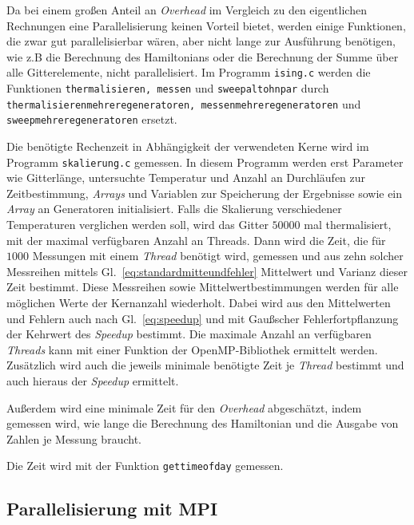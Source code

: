 	
	Da bei einem großen Anteil an \textit{Overhead} im Vergleich zu den eigentlichen Rechnungen eine Parallelisierung keinen Vorteil bietet, werden einige Funktionen, die zwar gut parallelisierbar wären, aber nicht lange zur Ausführung benötigen, wie z.B die Berechnung des Hamiltonians oder die Berechnung der Summe über alle Gitterelemente, nicht parallelisiert. Im Programm \texttt{ising.c} werden die Funktionen \texttt{thermalisieren, messen} und \texttt{sweepaltohnpar} durch \texttt{thermalisierenmehreregeneratoren, messenmehreregeneratoren} und \texttt{sweepmehreregeneratoren} ersetzt.
	
	Die benötigte Rechenzeit in Abhängigkeit der verwendeten Kerne wird im Programm \texttt{skalierung.c} gemessen. In diesem Programm werden erst Parameter wie Gitterlänge, untersuchte Temperatur und Anzahl an Durchläufen zur Zeitbestimmung, \textit{Arrays} und Variablen zur Speicherung der Ergebnisse sowie ein \textit{Array} an Generatoren initialisiert. Falls die Skalierung verschiedener Temperaturen verglichen werden soll, wird das Gitter $50000$ mal thermalisiert, mit der maximal verfügbaren Anzahl an Threads. Dann wird die Zeit, die für $\num{1000}$ Messungen mit einem \textit{Thread} benötigt wird, gemessen und aus zehn solcher Messreihen mittels Gl.~\ref{eq:standardmitteundfehler} Mittelwert und Varianz dieser Zeit bestimmt. Diese Messreihen sowie Mittelwertbestimmungen werden für alle möglichen Werte der Kernanzahl wiederholt. Dabei wird aus den Mittelwerten und Fehlern auch nach Gl.~\ref{eq:speedup} und mit Gaußscher Fehlerfortpflanzung der Kehrwert des \textit{Speedup} bestimmt. Die maximale Anzahl an verfügbaren \textit{Threads} kann mit einer Funktion der OpenMP-Bibliothek ermittelt werden. 
	Zusätzlich wird auch die jeweils minimale benötigte Zeit je \textit{Thread} bestimmt und auch hieraus der \textit{Speedup} ermittelt.
	
	Außerdem wird eine minimale Zeit für den \textit{Overhead} abgeschätzt, indem gemessen wird, wie lange die Berechnung des Hamiltonian und die Ausgabe von Zahlen je Messung braucht. 
	
	Die Zeit wird mit der Funktion \texttt{gettimeofday} gemessen.
	
	\subsection{Parallelisierung mit MPI}
	\label{subsec:parmpi}
	
